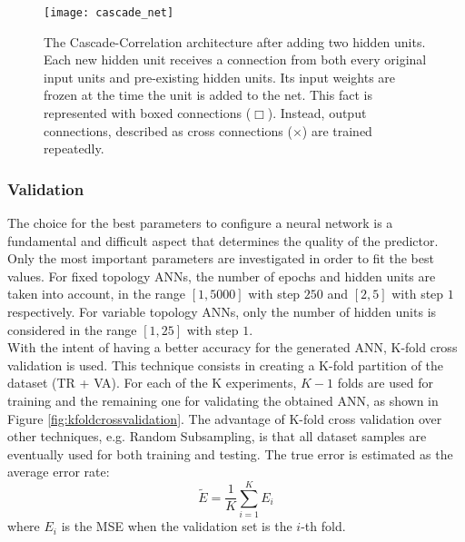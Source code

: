 \begin{figure}[tb]
	\begin{center}
		\texttt{[image: cascade\_net]}
		\caption[The Cascade-Correlation architecture]{The Cascade-Correlation architecture after adding two hidden units. Each new hidden unit receives a connection from both every original input units and pre-existing hidden units. Its input weights are frozen at the time the unit is added to the net. This fact is represented with boxed connections ($\Box$). Instead, output connections, described as cross connections ($\times$) are trained repeatedly.}
		\label{fig:cascade_net}
	\end{center}
\end{figure}


\subsubsection{Validation}
\label{subsubsec:validation}
The choice for the best parameters to configure a neural network is a fundamental and difficult aspect that determines the quality of the predictor. Only the most important parameters are investigated in order to fit the best values. For fixed topology ANNs, the number of epochs and hidden units are taken into account, in the range $[1, 5000]$ with step $250$ and $[2, 5]$ with step $1$ respectively.
For variable topology ANNs, only the number of hidden units is considered in the range $[1, 25]$ with step $1$.\\
With the intent of having a better accuracy for the generated ANN, K-fold cross validation is used. This technique consists in creating a K-fold partition of the dataset (TR + VA). For each of the K experiments, $K-1$ folds are used for training and the remaining one for validating the obtained ANN, as shown in Figure \ref{fig:kfoldcrossvalidation}. The advantage of K-fold cross validation over other techniques, e.g. Random Subsampling, is that all dataset samples are eventually used for both training and testing. The true error is estimated as the average error rate:
 \begin{equation}
  	\tilde{E} = \frac{1}{K}\sum_{i=1}^{K}E_i
 \end{equation}
where $E_i$ is the MSE when the validation set is the $i$-th fold. 

